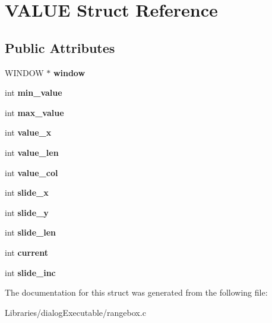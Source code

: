 \hypertarget{struct_v_a_l_u_e}{}\section{V\+A\+L\+UE Struct Reference}
\label{struct_v_a_l_u_e}
\subsection*{Public Attributes}
\begin{DoxyCompactItemize}
\item 
W\+I\+N\+D\+OW $\ast$ {\bfseries window}\hypertarget{struct_v_a_l_u_e_a95835b210da73d406f605c8ae1589a31}{}\label{struct_v_a_l_u_e_a95835b210da73d406f605c8ae1589a31}

\item 
int {\bfseries min\+\_\+value}\hypertarget{struct_v_a_l_u_e_af4e09bc163a5fb0d9365edb38e2d39e5}{}\label{struct_v_a_l_u_e_af4e09bc163a5fb0d9365edb38e2d39e5}

\item 
int {\bfseries max\+\_\+value}\hypertarget{struct_v_a_l_u_e_a0424b471ba4e0db7001145b51a979928}{}\label{struct_v_a_l_u_e_a0424b471ba4e0db7001145b51a979928}

\item 
int {\bfseries value\+\_\+x}\hypertarget{struct_v_a_l_u_e_ab8d6b02fb721dc8c2766b65a3b98e2fe}{}\label{struct_v_a_l_u_e_ab8d6b02fb721dc8c2766b65a3b98e2fe}

\item 
int {\bfseries value\+\_\+len}\hypertarget{struct_v_a_l_u_e_a0da880841f357992d851b4351748cde0}{}\label{struct_v_a_l_u_e_a0da880841f357992d851b4351748cde0}

\item 
int {\bfseries value\+\_\+col}\hypertarget{struct_v_a_l_u_e_ac429fa6b1fa7662fdfb7082131922c12}{}\label{struct_v_a_l_u_e_ac429fa6b1fa7662fdfb7082131922c12}

\item 
int {\bfseries slide\+\_\+x}\hypertarget{struct_v_a_l_u_e_a1f94977c410c66338260e7f40c6f22e8}{}\label{struct_v_a_l_u_e_a1f94977c410c66338260e7f40c6f22e8}

\item 
int {\bfseries slide\+\_\+y}\hypertarget{struct_v_a_l_u_e_af821bb4399fb94e7e87ceec912a68eee}{}\label{struct_v_a_l_u_e_af821bb4399fb94e7e87ceec912a68eee}

\item 
int {\bfseries slide\+\_\+len}\hypertarget{struct_v_a_l_u_e_aef47d9f11c25183d7cf17d8f6de00bb6}{}\label{struct_v_a_l_u_e_aef47d9f11c25183d7cf17d8f6de00bb6}

\item 
int {\bfseries current}\hypertarget{struct_v_a_l_u_e_aec9a5f68b8798b8b7b71d16363874f4a}{}\label{struct_v_a_l_u_e_aec9a5f68b8798b8b7b71d16363874f4a}

\item 
int {\bfseries slide\+\_\+inc}\hypertarget{struct_v_a_l_u_e_aa3f2c1751a4f11c6817a54b3d9eae9e8}{}\label{struct_v_a_l_u_e_aa3f2c1751a4f11c6817a54b3d9eae9e8}

\end{DoxyCompactItemize}


The documentation for this struct was generated from the following file\+:\begin{DoxyCompactItemize}
\item 
Libraries/dialog\+Executable/rangebox.\+c\end{DoxyCompactItemize}
